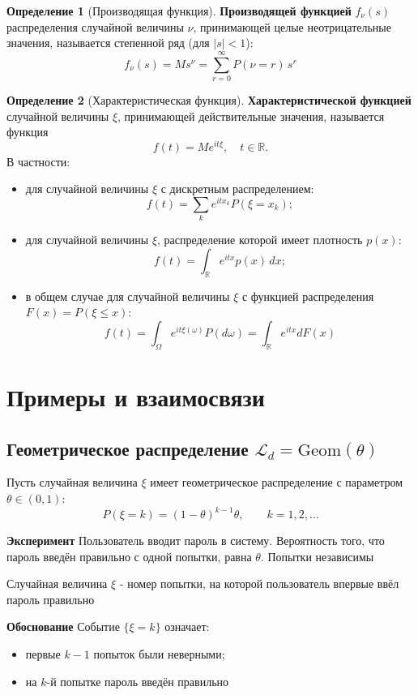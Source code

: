 \documentclass[12pt,a4paper]{article}
\theoremstyle{definition}
\newtheorem{definition}{Определение}[section]
\begin{document}
\begin{definition}[Производящая функция]
\textbf{Производящей функцией} $f_\nu(s)$ распределения случайной величины $\nu$, принимающей целые неотрицательные значения, называется степенной ряд (для $|s| < 1$):
\[
f_\nu(s) = Ms^\nu = \sum_{r=0}^{\infty} P(\nu = r)\, s^r
\]
\end{definition}

\begin{definition}[Характеристическая функция]
\textbf{Характеристической функцией} случайной величины $\xi$, принимающей действительные значения, называется функция
\[
f(t) = Me^{it\xi}, \quad t \in \mathbb{R}.
\]
В частности:
\begin{itemize}
    \item для случайной величины $\xi$ с дискретным распределением:
    \[
    f(t) = \sum_{k} e^{it x_k} P(\xi = x_k);
    \]
    \item для случайной величины $\xi$, распределение которой имеет плотность $p(x)$:
    \[
    f(t) = \int_{\mathbb{R}} e^{itx} p(x)\,dx;
    \]
    \item в общем случае для случайной величины $\xi$ с функцией распределения $F(x) = P(\xi \le x)$:
    \[
    f(t) = \int_{\Omega} e^{it\xi(\omega)} P(d\omega) = \int_{\mathbb{R}} e^{itx} dF(x)
    \]
\end{itemize}
\end{definition}

\section{Примеры и взаимосвязи}

\subsection{Геометрическое распределение $\mathscr{L}_d=\mathrm{Geom}(\theta)$}

Пусть случайная величина $\xi$ имеет геометрическое распределение с параметром
$\theta \in (0,1)$:
\[
P(\xi = k) = (1-\theta)^{k-1}\theta,
\qquad k=1,2,\dots
\]

\textbf{Эксперимент}
Пользователь вводит пароль в систему. Вероятность того, что пароль введён правильно с одной попытки, равна $\theta$. Попытки независимы

Случайная величина $\xi$ - номер попытки, на которой пользователь впервые ввёл пароль правильно

\textbf{Обоснование}
Событие $\{\xi=k\}$ означает:
\begin{itemize}
    \item первые $k-1$ попыток были неверными;
    \item на $k$-й попытке пароль введён правильно
\end{itemize}
\end{document}

